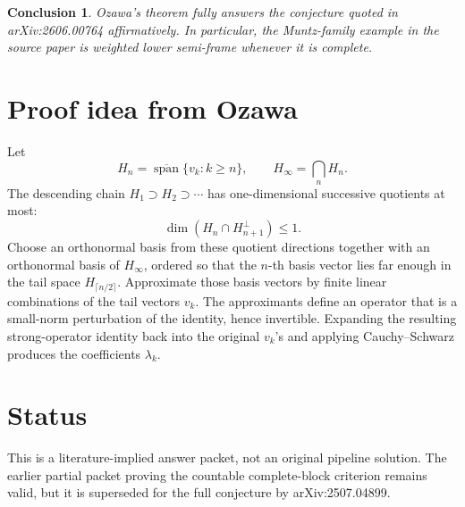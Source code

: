 \documentclass[11pt]{article}
\newtheorem*{conclusion}{Conclusion}
\begin{document}
\begin{conclusion}
Ozawa's theorem fully answers the conjecture quoted in arXiv:2606.00764
affirmatively. In particular, the Muntz-family example in the source
paper is weighted lower semi-frame whenever it is complete.
\end{conclusion}

\section*{Proof idea from Ozawa}

Let
\[
  H_n=\overline{\operatorname{span}}\{v_k:k\geq n\},
  \qquad
  H_\infty=\bigcap_n H_n.
\]
The descending chain \(H_1\supset H_2\supset\cdots\) has one-dimensional
successive quotients at most:
\[
  \dim(H_n\cap H_{n+1}^{\perp})\leq 1.
\]
Choose an orthonormal basis from these quotient directions together
with an orthonormal basis of \(H_\infty\), ordered so that the \(n\)-th
basis vector lies far enough in the tail space \(H_{\lceil n/2\rceil}\).
Approximate those basis vectors by finite linear combinations of the
tail vectors \(v_k\). The approximants define an operator that is a
small-norm perturbation of the identity, hence invertible. Expanding the
resulting strong-operator identity back into the original \(v_k\)'s and
applying Cauchy--Schwarz produces the coefficients \(\lambda_k\).

\section*{Status}

This is a literature-implied answer packet, not an original pipeline
solution. The earlier partial packet proving the countable complete-block
criterion remains valid, but it is superseded for the full conjecture by
arXiv:2507.04899.
\end{document}
